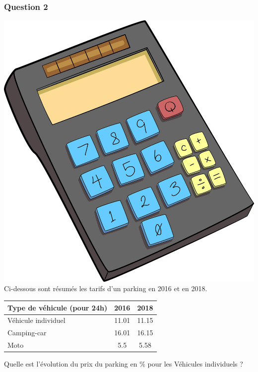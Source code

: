 \documentclass[15pt, mathserif]{beamer}
\begin{document}
\begin{frame} 
	\frametitle{Question 2}
\includegraphics[scale=0.01]{calculatrice}Ci-dessous sont résumés les tarifs d'un parking en 2016 et en 2018. 
 \begin{center} 
 \begin{tabular}{|C{3cm}|c|c|} 
 \hline 
 Type de véhicule (pour 24h) & 2016 & 2018 \\ 
 \hline 
 Véhicule individuel & 11.01& 11.15\\ 
 \hline 
 Camping-car & 16.01& 16.15\\ 
 \hline 
 Moto & 5.5& 5.58\\ 
 \hline 
 \end{tabular} 
\end{center} 
  Quelle est l'évolution du prix du parking en \% pour les Véhicules individuels ? \end{frame}
\end{document}
